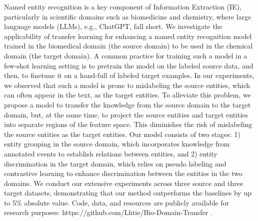 Named entity recognition is a key component of Information Extraction (IE), particularly in scientific domains such as biomedicine and chemistry, where large language models (LLMs), e.g., ChatGPT, fall short. We investigate the applicability of transfer learning for enhancing a named entity recognition model trained in the biomedical domain (the source domain) to be used in the chemical domain (the target domain). A common practice for training such a model in a few-shot learning setting is to pretrain the model on the labeled source data, and then, to finetune it on a hand-full of labeled target examples. In our experiments, we observed that such a model is prone to mislabeling the source entities, which can often appear in the text, as the target entities. To alleviate this problem, we propose a model to transfer the knowledge from the source domain to the target domain, but, at the same time, to project the source entities and target entities into separate regions of the feature space. This diminishes the risk of mislabeling the source entities as the target entities. Our model consists of two stages: 1) entity grouping in the source domain, which incorporates knowledge from annotated events to establish relations between entities, and 2) entity discrimination in the target domain, which relies on pseudo labeling and contrastive learning to enhance discrimination between the entities in the two domains. We conduct our extensive experiments across three source and three target datasets, demonstrating that our method outperforms the baselines by up to 5\% absolute value. Code, data, and resources are publicly available for research purposes: https://github.com/Lhtie/Bio-Domain-Transfer .